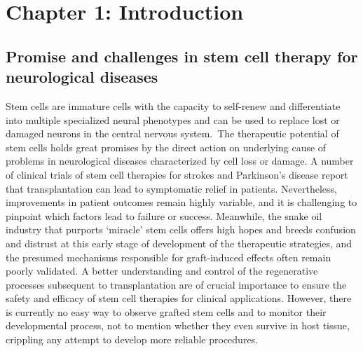 \newpage
\section{Chapter 1: Introduction}

\subsection{Promise and challenges in stem cell  therapy for neurological diseases}

Stem cells  are immature cells with the capacity to self-renew and differentiate into  multiple specialized neural phenotypes and can be used to replace lost or  damaged neurons in the central nervous system. The therapeutic potential of stem cells  holds great promises by the direct action on underlying cause of problems in  neurological diseases characterized by cell loss or damage. A number of clinical trials of stem cell therapies for strokes  and Parkinson's disease report that transplantation can lead to symptomatic  relief in patients. Nevertheless, improvements in patient outcomes remain  highly variable, and it is challenging to pinpoint which factors lead to  failure or success. Meanwhile, the snake oil industry that purports ‘miracle’  stem cells offers high hopes and breeds confusion and distrust at this early  stage of development of the therapeutic strategies, and the presumed mechanisms  responsible for graft-induced effects often remain poorly validated. A better  understanding and control of the regenerative processes subsequent to  transplantation are of crucial importance to ensure the safety and efficacy of  stem cell therapies for clinical applications. However, there is currently no  easy way to observe grafted stem cells and to monitor their developmental  process, not to mention whether they even survive in host tissue, crippling any  attempt to develop more reliable procedures.
